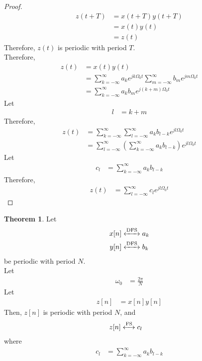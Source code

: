 \documentclass[titlepage, fleqn, a4paper, 12pt, twoside]{article}
\theoremstyle{definition}
\theoremstyle{theorem}
\newtheorem{theorem}{Theorem}
\newcommand{\FS}{\xleftrightarrow{\mathrm{FS}}}
\newcommand{\DFS}{\xleftrightarrow{\mathrm{DFS}}}
\begin{document}
\begin{proof}
	\begin{align*}
		z(t + T) &= x(t + T) y(t + T)\\
		&= x(t) y(t)\\
		&= z(t)
	\end{align*}
	Therefore, $z(t)$ is periodic with period $T$.\\
	Therefore,
	\begin{align*}
		z(t) &= x(t) y(t)\\
		&= \sum\limits_{k = -\infty}^{\infty} a_k e^{j k \Omega_0 t} \sum\limits_{m = -\infty}^{\infty} b_m e^{j m \Omega_0 t}\\
		&= \sum\limits_{k = -\infty}^{\infty} a_k b_m e^{j (k + m) \Omega_0 t}
	\end{align*}
	Let
	\begin{align*}
		l &= k + m
	\end{align*}
	Therefore,
	\begin{align*}
		z(t) &= \sum\limits_{k = -\infty}^{\infty} \sum\limits_{l = -\infty}^{\infty} a_k b_{l - k} e^{j l \Omega_0 t}\\
		&= \sum\limits_{l = -\infty}^{\infty} \left( \sum\limits_{k = -\infty}^{\infty} a_k b_{l - k} \right) e^{j l \Omega_0 t}
	\end{align*}
	Let
	\begin{align*}
		c_l &= \sum\limits_{k = -\infty}^{\infty} a_k b_{l - k}
	\end{align*}
	Therefore,
	\begin{align*}
		z(t) &= \sum\limits_{l = -\infty}^{\infty} c_l e^{j l \Omega_0 t}
	\end{align*}
\end{proof}

\begin{theorem}
	Let
	\begin{align*}
		x[n] &\DFS a_k\\
		y[n] &\DFS b_k
	\end{align*}
	be periodic with period $N$.\\
	Let
	\begin{align*}
		\omega_0 &= \frac{2 \pi}{N}
	\end{align*}
	Let
	\begin{align*}
		z[n] &= x[n] y[n]
	\end{align*}
	Then, $z[n]$ is periodic with period $N$, and
	\begin{align*}
		z[n] &\FS c_l
	\end{align*}
	where
	\begin{align*}
		c_l &= \sum\limits_{k = -\infty}^{\infty} a_k b_{l - k}
	\end{align*}
\end{theorem}
\end{document}
